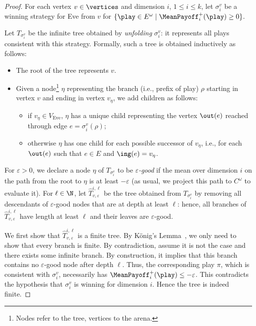 \begin{proof}
For each vertex $v \in \vertices$ and dimension $i$, $1 \leq i \leq k$, let $\sigma_i^v$ be a winning strategy for Eve from $v$ for $\{\play \in E^\omega \mid \MeanPayoff^{+}_{i}(\play) \geq 0\}$.

Let $T_{\sigma_i^v}$ be the infinite tree obtained by \textit{unfolding}  $\sigma_i^v$: it represents all plays consistent with this strategy. Formally, such a tree is obtained inductively as follows:
\begin{itemize}
\item The root of the tree represents $v$.
\item Given a node\footnote{Nodes refer to the tree, vertices to the arena.} $\eta$ representing the branch (i.e., prefix of play) $\rho$ starting in vertex $v$ and ending in vertex $v_\eta$, we add children as follows:
\begin{itemize}
\item if $v_\eta \in V_{\text{Eve}}$, $\eta$ has a unique child representing the vertex $\out(e)$ reached through edge $e = \sigma_i^v(\rho)$;
\item otherwise $\eta$ has one child for each possible successor of $v_\eta$, i.e., for each $\out(e)$ such that $e \in E$ and $\ing(e) = v_\eta$.
\end{itemize} 
\end{itemize} 
For $\varepsilon > 0$, we declare a node $\eta$ of $T_{\sigma_i^v}$ to be \textit{$\varepsilon$-good} if the mean over dimension $i$ on the path from the root to $\eta$ is at least $-\varepsilon$ (as usual, we project this path to $C^\omega$ to evaluate it). For $\ell \in \N$, let $\widehat{T}^{i, \ell}_{v, \varepsilon}$ be the tree obtained from $T_{\sigma_i^v}$ by removing all descendants of $\varepsilon$-good nodes that are at depth at least $\ell$: hence, all branches of $\widehat{T}^{i, \ell}_{v, \varepsilon}$ have length at least $\ell$ and their leaves are $\varepsilon$-good.

We first show that $\widehat{T}^{i, \ell}_{v, \varepsilon}$ is a finite tree. By K\"onig's Lemma~\cite{Konig:1936}, we only need to show that every branch is finite. By contradiction, assume it is not the case and there exists some infinite branch. By construction, it implies that this branch contains no $\varepsilon$-good node after depth $\ell$. Thus, the corresponding play $\pi$, which is consistent with $\sigma_i^v$, necessarily has $\MeanPayoff^{+}_{i}(\play) \leq -\varepsilon$. This contradicts the hypothesis that $\sigma_i^v$ is winning for dimension $i$. Hence the tree is indeed finite.


\end{proof}
